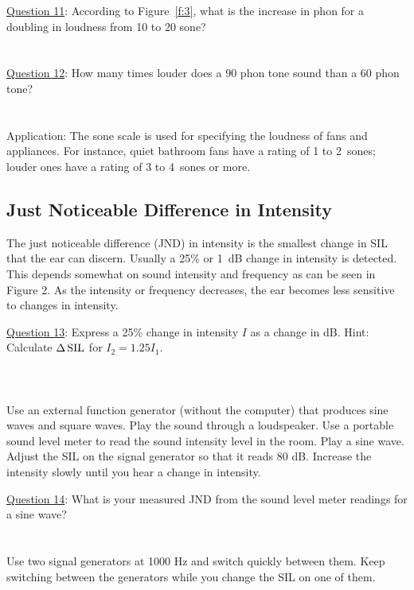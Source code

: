 \documentclass[11pt]{NSF}
\begin{document}
\underline{Question 11}: According to Figure~\ref{f:3}, what is the increase in phon for a doubling in loudness from 10 to 20
sone? \\
\\
\\

\underline{Question 12}: How many times louder does a 90 phon tone sound than a 60 phon tone? 
\\
\\
\\

Application:
The sone scale is used for specifying the loudness of fans and
appliances. For instance, quiet bathroom fans have a rating of 1 to 
2~sones; louder ones have a rating of 3 to 4~sones or more.

\subsection{Just Noticeable Difference in Intensity}

The just noticeable difference (JND) in intensity is the smallest
change in SIL that the ear can discern. Usually a 25\% or 1~dB change in
intensity is detected. This depends somewhat on sound intensity and
frequency as can be seen in Figure 2. As the intensity or frequency
decreases, the ear becomes less sensitive to changes in intensity.

\underline{Question 13}: Express a 25\% change in intensity $I$ as a change in dB. 
Hint: Calculate $\Delta\,{\rm SIL}$ for $I_2 = 1.25 I_1$.
\\
\\
\\
\\

Use an external function generator (without the computer) that produces sine waves and square
waves. Play the sound through a loudspeaker. Use a portable sound level meter to read the sound
intensity level in the room. Play a sine wave. Adjust the SIL on the signal generator so that it
reads 80 dB. Increase the intensity slowly until you hear a change in intensity.

\underline{Question 14}: What is your measured JND from the sound level meter readings for a sine wave? 
\\
\\
\\

Use two signal generators at 1000 Hz and switch quickly between them. Keep switching between
the generators while you change the SIL on one of them.
\end{document}
